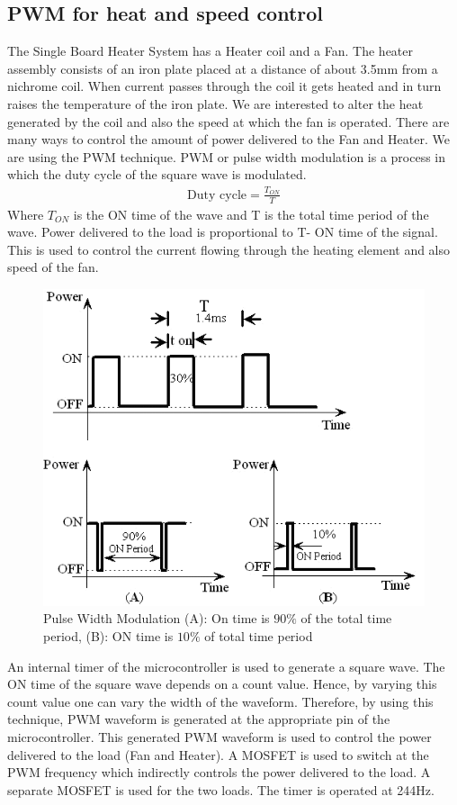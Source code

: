 \documentclass[12pt]{report}
\begin{document}
\subsection{PWM for heat and speed control}
The Single Board Heater System has a Heater coil and a Fan. The heater assembly consists of an iron plate placed at a distance of about 3.5mm from a nichrome coil. When current passes through the coil it gets heated and in turn raises the temperature of the iron plate. We are interested to alter the heat generated by the coil and also the speed at which the fan is operated.
There are many ways to control the amount of power delivered to the Fan and Heater. We are using the PWM technique.
PWM or pulse width modulation is a process in which the duty cycle of the square wave is modulated.
\begin{align}
      \text{Duty cycle} = \frac{T_{ON}}{T}
\end{align}
Where $T_{ON}$ is the ON time of the wave and  T is the total time period of the wave. Power delivered to the load is proportional to T- ON time of the signal. This is used to control the current flowing through the heating element and also speed of the fan.
\begin{figure}
\centering
\includegraphics[width=0.5\linewidth]{pwm}
\caption{Pulse Width Modulation (A): On time is $90\%$ of the total time period,    (B): ON time is $10\%$ of total time period}
\end{figure} 
An internal timer of the microcontroller is used to generate a square wave. The ON time of the square wave depends on a count value. Hence, by varying this count value one can vary the width of the waveform. Therefore, by using this technique, PWM waveform is generated at the appropriate pin of the microcontroller. This generated PWM waveform is used to control the power delivered to the load (Fan and Heater). A MOSFET is used to switch at the PWM frequency which indirectly controls the power delivered to the load. A separate MOSFET is used for the two loads. The timer is operated at 244Hz.
\end{document}
